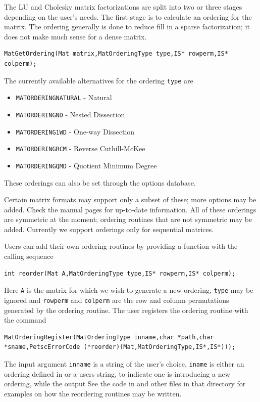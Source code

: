 {{{The LU and Cholesky 
matrix factorizations are split into 
two or three stages depending on the user's needs. The first stage is
to calculate an ordering for the matrix.  The ordering generally is
done to reduce fill in a sparse factorization; it does not make much
sense for a dense matrix.  
\begin{lstlisting}
MatGetOrdering(Mat matrix,MatOrderingType type,IS* rowperm,IS* colperm);
\end{lstlisting}
The currently available alternatives for the ordering \lstinline{type} are
\begin{itemize}
\item \lstinline{MATORDERINGNATURAL} - Natural
\item \lstinline{MATORDERINGND} - Nested Dissection
\item \lstinline{MATORDERING1WD} - One-way Dissection
\item \lstinline{MATORDERINGRCM} - Reverse Cuthill-McKee
\item \lstinline{MATORDERINGQMD} - Quotient Minimum Degree
\end{itemize}
These orderings can also be set through the options database.

Certain matrix formats may support only a subset of these; more options may
be added. Check the manual pages for up-to-date information. All of these orderings are
symmetric at the moment; ordering routines that are
not symmetric may be added. Currently we support orderings only for
sequential matrices.

Users can add their own ordering routines
by providing a function with the calling sequence
\begin{lstlisting}
int reorder(Mat A,MatOrderingType type,IS* rowperm,IS* colperm);
\end{lstlisting}
Here \lstinline{A} is the matrix for which we wish to generate a new ordering,
\lstinline{type} may be ignored and \lstinline{rowperm} and \lstinline{colperm} are the row
and column permutations generated by the ordering routine.
The user registers the ordering routine
with the command
\begin{lstlisting}
MatOrderingRegister(MatOrderingType inname,char *path,char *sname,PetscErrorCode (*reorder)(Mat,MatOrderingType,IS*,IS*)));
\end{lstlisting}
The  
input argument \lstinline{inname} is a string of the user's choice, \lstinline{iname} is either
an ordering defined in  or a users string,
to indicate one is introducing a new ordering, while the output
See the code in  and other files in that
directory for examples on how the reordering routines may be written.

}}}
